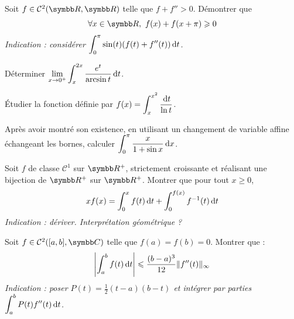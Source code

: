 \begin{exercice}
    Soit $f\in \mathcal{C}^{2}(\R,\R)$ telle que $f+f''>0$. Démontrer que
    \[\forall x\in\R,~f(x)+f(x+\pi)\geqslant0\]
    \textit{Indication : considérer $\displaystyle \int_{0}^{\pi}\sin(t)(f(t)+f''(t))\,\mathrm{d}t$.}
\end{exercice}

\begin{exercice}
    Déterminer $\displaystyle \lim_{x\rightarrow0^{+}}\int_{x}^{2x}\frac{e^{t}}{\arcsin t}\,\mathrm{d}t$.
\end{exercice}

\begin{exercice}
    Étudier la fonction définie par $\displaystyle f(x)=\int_{x}^{x^{2}}\frac{\,\mathrm{d}t}{\ln t}$.
\end{exercice}

\begin{exercice}
    Après avoir montré son existence, en utilisant un changement de variable affine échangeant les bornes, 
    calculer $\displaystyle \int_{0}^{\pi}\frac{x}{1+\sin x}\,\mathrm{d}x$.
\end{exercice}

\begin{exercice}
    Soit $f$ de classe $\mathcal{C}^{1}$ sur $\R^{+}$, strictement croissante et réalisant une bijection de $\R^{+}$ sur $\R^{+}$.
    Montrer que pour tout $x\geqslant0$,
    \[xf(x)=\int_{0}^{x}f(t)\,\mathrm{d}t+\int_{0}^{f(x)}f^{-1}(t)\,\mathrm{d}t\]
    \textit{Indication : dériver. Interprétation géométrique ?}
\end{exercice}

\begin{exercice}
    Soit $f\in \mathcal{C}^{2}([a,b],\C)$ telle que $f(a)=f(b)=0$. Montrer que :
    \[\left| \int_{a}^{b}f(t)\,\mathrm{d}t \right| \leqslant \frac{(b-a)^{3}}{12} \|f''(t)\|_{\infty}\]
    \textit{Indication : poser $P(t)=\frac{1}{2}(t-a)(b-t)$ et intégrer par parties $\displaystyle \int_{a}^{b}P(t)f''(t)\,\mathrm{d}t$.}
\end{exercice}

